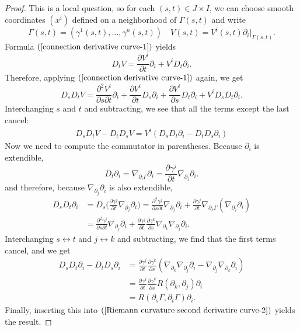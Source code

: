 \begin{proof}
This is a local question, so for each $(s,t)\in J\times I$, we can choose smooth coordinates $(x^i)$ defined on a neighborhood of $\Gamma(s,t)$ and write
\[\Gamma(s,t)=(\gamma^1(s,t),\dots,\gamma^n(s,t))\quad V(s,t)=V^i(s,t)\partial_i|_{\Gamma(s,t)}.\]
Formula $(\ref{connection derivative curve-1})$ yields
\[D_tV=\frac{\partial V^i}{\partial t}\partial_i+V^iD_t\partial_i.\]
Therefore, applying $(\ref{connection derivative curve-1})$ again, we get
\[D_sD_tV=\frac{\partial^2V^i}{\partial s\partial t}\partial_i+\frac{\partial V^i}{\partial t}D_s\partial_i+\frac{\partial V^i}{\partial s}D_t\partial_i+V^iD_sD_t\partial_i.\]
Interchanging $s$ and $t$ and subtracting, we see that all the terms except the last cancel:
\begin{align}\label{Riemann curvature second derivatire curve-2}
D_sD_tV-D_tD_sV=V^i(D_sD_t\partial_i-D_tD_s\partial_i)
\end{align}
Now we need to compute the commutator in parentheses. Because $\partial_i$ is extendible,
\[D_t\partial_i=\nabla_{\partial_i\Gamma}\partial_i=\frac{\partial\gamma^j}{\partial t}\nabla_{\partial_j}\partial_i.\]
and therefore, because $\nabla_{\partial_j}\partial_i$ is also extendible,
\begin{align*}
D_sD_t\partial_i&=D_s\Big(\frac{\partial\gamma^j}{\partial t}\nabla_{\partial_j}\partial_i\Big)=\frac{\partial^2\gamma^j}{\partial s\partial t}\nabla_{\partial_j}\partial_i+\frac{\partial\gamma^j}{\partial t}\nabla_{\partial_s\Gamma}(\nabla_{\partial_j}\partial_i)\\
&=\frac{\partial^2\gamma^j}{\partial s\partial t}\nabla_{\partial_j}\partial_i+\frac{\partial\gamma^j}{\partial t}\frac{\partial\gamma^k}{\partial s}\nabla_{\partial_k}\nabla_{\partial_j}\partial_i.
\end{align*}
Interchanging $s\leftrightarrow t$ and $j\leftrightarrow k$ and subtracting, we find that the first terms cancel, and we get
\begin{align*}
D_sD_t\partial_i-D_tD_s\partial_i&=\frac{\partial\gamma^j}{\partial t}\frac{\partial\gamma^k}{\partial s}(\nabla_{\partial_k}\nabla_{\partial_j}\partial_i-\nabla_{\partial_j}\nabla_{\partial_k}\partial_i)\\
&=\frac{\partial\gamma^j}{\partial t}\frac{\partial\gamma^k}{\partial s}R(\partial_k,\partial_j)\partial_i\\
&=R(\partial_s\Gamma,\partial_t\Gamma)\partial_i.
\end{align*}
Finally, inserting this into $(\ref{Riemann curvature second derivatire curve-2})$ yields the result.
\end{proof}
